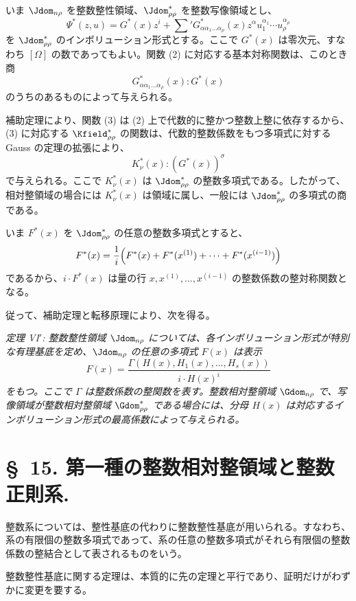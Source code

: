 \documentclass[11pt]{article}
\begin{document}
いま $\Jdom_{n\rho}$ を整数整性領域、$\Jdom^*_{\rho\rho}$ を整数写像領域とし、
\[
  \Psi^*(z,u)=G^*(x)z^i+
  \sum{}'G^*_{\alpha\alpha_1\ldots\alpha_\rho}(x)
  z^\alpha u_1^{\alpha_1}\cdots u_\rho^{\alpha_\rho}
\]
を $\Jdom^*_{\rho\rho}$ のインボリューション形式とする。ここで $G^*(x)$ は零次元、すなわち $[\Omega]$ の数であってもよい。関数 (2) に対応する基本対称関数は、このとき商
\begin{equation}
  G^*_{\alpha\alpha_1\ldots\alpha_\rho}(x):G^*(x)
\tag{4}
\end{equation}
のうちのあるものによって与えられる。

補助定理により、関数 (3) は (2) 上で代数的に整かつ整数上整に依存するから、(3) に対応する $\Kfield^*_{\rho\rho}$ の関数は、代数的整数係数をもつ多項式に対する Gauss の定理の拡張により、
\begin{equation}
  K_\nu^*(x):(G^*(x))^\sigma
\tag{5}
\end{equation}
で与えられる。ここで $K_\nu^*(x)$ は $\Jdom^*_{\rho\rho}$ の整数多項式である。したがって、相対整領域の場合には $K_\nu^*(x)$ は領域に属し、一般には $\Jdom^*_{\rho\rho}$ の多項式の商である。

いま $F^*(x)$ を $\Jdom^*_{\rho\rho}$ の任意の整数多項式とすると、
\[
  F^*(x)=\frac1i\Bigl(F^*(x)+F^*(x^{(1)})+\cdots+F^*(x^{(i-1)})\Bigr)
\]
であるから、$i\cdot F^*(x)$ は量の行 $x,x^{(1)},\ldots,x^{(i-1)}$ の整数係数の整対称関数となる。

従って、補助定理と転移原理により、次を得る。

\emph{定理 VI$'$: 整数整性領域 $\Jdom_{n\rho}$ については、各インボリューション形式が特別な有理基底を定め、$\Jdom_{n\rho}$ の任意の多項式 $F(x)$ は表示}
\[
  F(x)=\frac{\Gamma(H(x),H_1(x),\ldots,H_s(x))}{i\cdot H(x)^i}
\]
\emph{をもつ。ここで $\Gamma$ は整数係数の整関数を表す。整数相対整領域 $\Gdom_{n\rho}$ で、写像領域が整数相対整領域 $\Gdom^*_{\rho\rho}$ である場合には、分母 $H(x)$ は対応するインボリューション形式の最高係数によって与えられる。}

\section*{\S\ 15. 第一種の整数相対整領域と整数正則系.}

整数系については、整性基底の代わりに整数整性基底が用いられる。すなわち、系の有限個の整数多項式であって、系の任意の整数多項式がそれら有限個の整数係数の整結合として表されるものをいう。

整数整性基底に関する定理は、本質的に先の定理と平行であり、証明だけがわずかに変更を要する。
\end{document}
